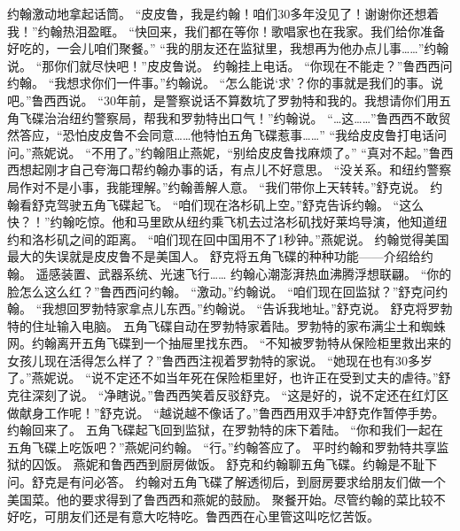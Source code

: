 \documentclass[a4paper,12pt,UTF8,twoside]{ctexbook}
\begin{document}
        约翰激动地拿起话筒。  
        “皮皮鲁，我是约翰！咱们30多年没见了！谢谢你还想着我！”约翰热泪盈眶。  
        “快回来，我们都在等你！歌唱家也在我家。我们给你准备好吃的，一会儿咱们聚餐。”  
        “我的朋友还在监狱里，我想再为他办点儿事……”约翰说。  
        “那你们就尽快吧！”皮皮鲁说。  
        约翰挂上电话。  
        “你现在不能走？”鲁西西问约翰。  
        “我想求你们一件事。”约翰说。  
        “怎么能说‘求’？你的事就是我们的事。说吧。”鲁西西说。  
        “30年前，是警察说话不算数坑了罗勃特和我的。我想请你们用五角飞碟治治纽约警察局，帮我和罗勃特出口气！”约翰说。        
        “…这……”鲁西西不敢贸然答应，“恐怕皮皮鲁不会同意……他特怕五角飞碟惹事……”  
        “我给皮皮鲁打电话问问。”燕妮说。  
        “不用了。”约翰阻止燕妮，“别给皮皮鲁找麻烦了。”  
        “真对不起。”鲁西西想起刚才自己夸海口帮约翰办事的话，有点儿不好意思。  
        “没关系。和纽约警察局作对不是小事，我能理解。”约翰善解人意。  
        “我们带你上天转转。”舒克说。  
        约翰看舒克驾驶五角飞碟起飞。  
        “咱们现在洛杉矶上空。”舒克告诉约翰。  
        “这么快？！”约翰吃惊。他和马里欧从纽约乘飞机去过洛杉矶找好莱坞导演，他知道纽约和洛杉矶之间的距离。  
        “咱们现在回中国用不了1秒钟。”燕妮说。  
        约翰觉得美国最大的失误就是皮皮鲁不是美国人。  
        舒克将五角飞碟的种种功能——介绍给约翰。  
        遥感装置、武器系统、光速飞行……  
        约翰心潮澎湃热血沸腾浮想联翩。  
        “你的脸怎么这么红？”鲁西西问约翰。  
        “激动。”约翰说。  
        “咱们现在回监狱？”舒克问约翰。        
        “我想回罗勃特家拿点儿东西。”约翰说。  
        “告诉我地址。”舒克说。  
        舒克将罗勃特的住址输入电脑。  
        五角飞碟自动在罗勃特家着陆。罗勃特的家布满尘土和蜘蛛网。约翰离开五角飞碟到一个抽屉里找东西。  
        “不知被罗勃特从保险柜里救出来的女孩儿现在活得怎么样了？”鲁西西注视着罗勃特的家说。  
        “她现在也有30多岁了。”燕妮说。  
        “说不定还不如当年死在保险柜里好，也许正在受到丈夫的虐待。”舒克往深刻了说。  
        “净瞎说。”鲁西西笑着反驳舒克。  
        “这是好的，说不定还在红灯区做献身工作呢！”舒克说。  
        “越说越不像话了。”鲁西西用双手冲舒克作暂停手势。  
        约翰回来了。  
        五角飞碟起飞回到监狱，在罗勃特的床下着陆。  
        “你和我们一起在五角飞碟上吃饭吧？”燕妮问约翰。  
        “行。”约翰答应了。  
        平时约翰和罗勃特共享监狱的囚饭。  
        燕妮和鲁西西到厨房做饭。  
        舒克和约翰聊五角飞碟。约翰是不耻下问。舒克是有问必答。  
        约翰对五角飞碟了解透彻后，到厨房要求给朋友们做一个美国菜。他的要求得到了鲁西西和燕妮的鼓励。  
        聚餐开始。尽管约翰的菜比较不好吃，可朋友们还是有意大吃特吃。鲁西西在心里管这叫吃忆苦饭。  
\end{document}

